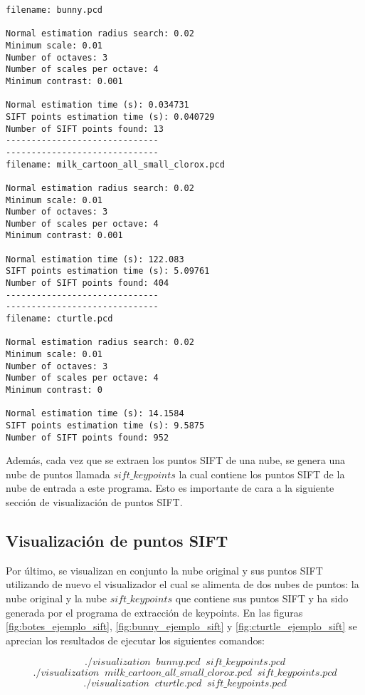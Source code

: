\begin{lstlisting}
filename: bunny.pcd

Normal estimation radius search: 0.02
Minimum scale: 0.01
Number of octaves: 3
Number of scales per octave: 4
Minimum contrast: 0.001

Normal estimation time (s): 0.034731
SIFT points estimation time (s): 0.040729
Number of SIFT points found: 13
------------------------------
------------------------------
filename: milk_cartoon_all_small_clorox.pcd

Normal estimation radius search: 0.02
Minimum scale: 0.01
Number of octaves: 3
Number of scales per octave: 4
Minimum contrast: 0.001

Normal estimation time (s): 122.083
SIFT points estimation time (s): 5.09761
Number of SIFT points found: 404
------------------------------
------------------------------
filename: cturtle.pcd

Normal estimation radius search: 0.02
Minimum scale: 0.01
Number of octaves: 3
Number of scales per octave: 4
Minimum contrast: 0

Normal estimation time (s): 14.1584
SIFT points estimation time (s): 9.5875
Number of SIFT points found: 952
\end{lstlisting}

Además, cada vez que se extraen los puntos SIFT de una nube, se genera una nube de puntos llamada $sift\_keypoints$ la cual contiene los puntos SIFT de la nube de entrada a este programa. Esto es importante de cara a la siguiente sección de visualización de puntos SIFT.


\subsection{Visualización de puntos SIFT}
Por último, se visualizan en conjunto la nube original y sus puntos SIFT utilizando de nuevo el visualizador el cual se alimenta de dos nubes de puntos: la nube original y la nube $sift\_keypoints$ que contiene sus puntos SIFT y ha sido generada por el programa de extracción de keypoints. En las figuras \ref{fig:botes_ejemplo_sift}, \ref{fig:bunny_ejemplo_sift} y \ref{fig:cturtle_ejemplo_sift} se aprecian los resultados de ejecutar los siguientes comandos:

$$./visualization\;\;bunny.pcd\;\;sift\_keypoints.pcd$$
$$./visualization\;\;milk\_cartoon\_all\_small\_clorox.pcd\;\;sift\_keypoints.pcd$$
$$./visualization\;\;cturtle.pcd\;\;sift\_keypoints.pcd$$



